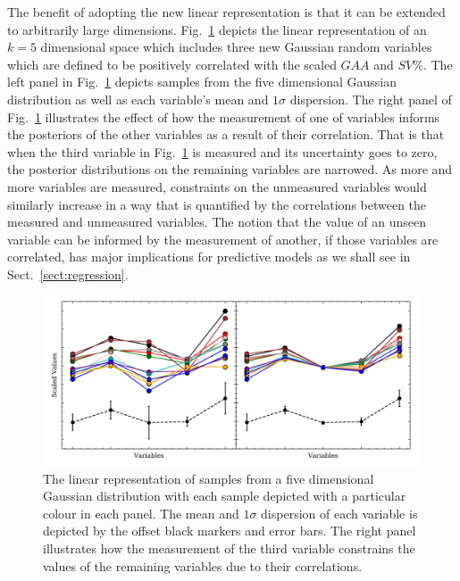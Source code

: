The benefit of adopting the new linear representation is that it can be extended to
arbitrarily large dimensions. Fig.~\ref{fig:linrepv2} depicts the linear representation
of an $k=5$ dimensional space which includes three new Gaussian random variables which
are defined to be positively correlated with the scaled $GAA$ and $SV$\%. The left panel
in Fig.~\ref{fig:linrepv2} depicts samples from the five dimensional Gaussian distribution
as well as each variable's mean and $1\sigma$ dispersion. The right panel of
Fig.~\ref{fig:linrepv2} illustrates the effect of how the measurement of one of variables
informs the posteriors of the other variables as a result of their correlation. That is
that when the third variable in Fig.~\ref{fig:linrepv2} is measured and its uncertainty
goes to zero, the posterior distributions on the remaining variables are narrowed. As
more and more variables are measured, constraints on the unmeasured variables would
similarly increase in a way that is quantified by the correlations between the
measured and unmeasured variables.
The notion that the value of an unseen variable can be informed by the measurement
of another, if those variables are correlated, has major implications for
predictive models as we shall see in Sect.~\ref{sect:regression}. \\

\begin{figure}
  \centering
  \includegraphics[width=\hsize]{figures/linearrep_v2.png}
  \caption[Linear representation of Gaussian random varaibles in five dimensions.]
          {The linear representation of samples from a five dimensional Gaussian
            distribution with each sample depicted with a particular colour in each
            panel. The mean and $1\sigma$ dispersion of each variable is depicted
            by the offset black markers and error bars. The right panel illustrates
            how the measurement of the third variable constrains the values of the
            remaining variables due to their correlations.}
  \label{fig:linrepv2}
\end{figure}


